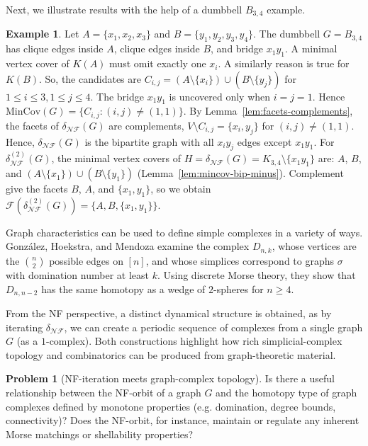 \documentclass[12pt]{article}
\theoremstyle{plain}
\theoremstyle{definition}
\newtheorem{example}[theorem]{Example}
\newtheorem{problem}[theorem]{Problem}
\newcommand{\F}{\mathcal{F}}
\newcommand{\MIN}{\mathrm{MinCov}}
\newcommand{\V}{V}
\newcommand{\A}{A}
\newcommand{\B}{B}
\begin{document}
	\medskip
	Next, we illustrate results with the help of a dumbbell $B_{3,4}$ example.
	 	\begin{example}\label{ex:b34}
		Let $\A=\{x_1,x_2,x_3\}$ and $\B=\{y_1,y_2,y_3,y_4\}$.
		The dumbbell $G=B_{3,4}$ has clique edges inside $\A$, clique edges inside $\B$, and bridge $x_1y_1$.
		 A minimal vertex cover of $K(\A)$ must omit exactly one $x_i$. A similarly reason is true for $K(\B)$.
		So, the candidates are $C_{i,j}=(\A\setminus\{x_i\})\cup(\B\setminus\{y_j\})$ for $1\le i\le 3, 1\le j\le 4.$ The bridge $x_1y_1$ is uncovered only when $i=j=1$. Hence $\MIN(G)=\{C_{i,j}:(i,j)\neq(1,1)\}$.
		 By Lemma~\ref{lem:facets-complements}, the facets of $\delta_{\mathcal{NF}}(G)$ are complements, 
		$\V\setminus C_{i,j}=\{x_i,y_j\}$ for $(i,j)\neq(1,1)$.
		Hence, $\delta_{\mathcal{NF}}(G)$ is the bipartite graph with all $x_i y_j$ edges except $x_1y_1$.
		For $\delta_{\mathcal{NF}}^{(2)}(G)$, the minimal vertex covers of $H=\delta_{\mathcal{NF}}(G)=K_{3,4}\setminus\{x_1y_1\}$ are:
		$\A$, $\B$, and $(\A\setminus\{x_1\})\cup(\B\setminus\{y_1\})$ (Lemma~\ref{lem:mincov-bip-minus}).
		Complement give the facets $\B$, $\A$, and $\{x_1,y_1\}$, so we obtain
		 $\F(\delta_{\mathcal{NF}}^{(2)}(G))=\{\A, \B, \{x_1,y_1\}\}.$ 
	\end{example}
	
	\medskip
	 Graph characteristics can be used to define simple complexes in a variety of ways.
	González, Hoekstra, and Mendoza \cite{GonzalezHoekstraMendoza} examine the complex $D_{n,k}$, whose vertices are the $\binom{n}{2}$ possible edges on $[n]$, and whose simplices correspond to graphs $\sigma$ with domination number at least $k$.	Using discrete Morse theory, they show that $D_{n,n-2}$ has the same homotopy as a wedge of $2$-spheres for $n\ge 4$.
	
	From the NF perspective, a distinct dynamical structure is obtained, as by iterating $\delta_{\mathcal{NF}}$, we can create a periodic sequence of complexes from a single graph $G$ (as a $1$-complex). Both constructions highlight how rich simplicial-complex topology and combinatorics can be produced from graph-theoretic material.
	
	\begin{problem}[NF-iteration meets graph-complex topology]
		Is there a useful relationship between the NF-orbit of a graph $G$ and the homotopy type of
		graph complexes defined by monotone properties (e.g. domination, degree bounds, connectivity)?
		Does the NF-orbit, for instance, maintain or regulate any inherent Morse matchings or shellability properties?
	\end{problem}
	
\end{document}
